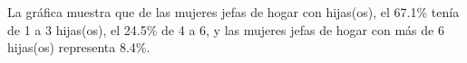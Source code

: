La gráfica muestra que de las mujeres jefas de hogar con hijas(os), el 67.1\% tenía de 1 a 3 hijas(os), el 24.5\% de 4 a 6, y las mujeres jefas de hogar con más de 6 hijas(os) representa 8.4\%. 
